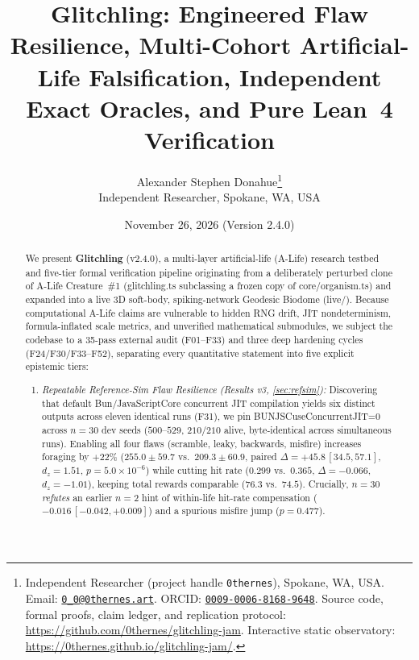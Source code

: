 \documentclass[11pt,a4paper]{article}
\title{\Large\bfseries Glitchling: Engineered Flaw Resilience, Multi-Cohort Artificial-Life Falsification, Independent Exact Oracles, and Pure Lean~4 Verification}
\author{
  Alexander Stephen Donahue\thanks{Independent Researcher (project handle \texttt{0thernes}), Spokane, WA, USA. Email: \href{mailto:0_0@0thernes.art}{\texttt{0\_0@0thernes.art}}. ORCID: \href{https://orcid.org/0009-0006-8168-9648}{\texttt{0009-0006-8168-9648}}. Source code, formal proofs, claim ledger, and replication protocol: \url{https://github.com/0thernes/glitchling-jam}. Interactive static observatory: \url{https://0thernes.github.io/glitchling-jam/}.}\\[0.35em]
  \normalsize Independent Researcher, Spokane, WA, USA
}
\date{November 26, 2026 (Version 2.4.0)}
\numberwithin{equation}{section}
\theoremstyle{plain}
\theoremstyle{definition}
\theoremstyle{remark}
\newcommand{\code}[1]{{\ttfamily\footnotesize\def\_{\textunderscore\penalty0\hskip0pt}#1}}
\begin{document}
\maketitle

\begin{abstract}
We present \textbf{Glitchling} (\code{v2.4.0}), a multi-layer artificial-life (A-Life) research testbed and five-tier formal verification pipeline originating from a deliberately perturbed clone of A-Life Creature~\#1 (\code{glitchling.ts} subclassing a frozen copy of \code{core/\allowbreak organism.ts}) and expanded into a live 3D soft-body, spiking-network Geodesic Biodome (\code{live/}). Because computational A-Life claims are vulnerable to hidden RNG drift, JIT nondeterminism, formula-inflated scale metrics, and unverified mathematical submodules, we subject the codebase to a 35-pass external audit (\code{F01--F33}) and three deep hardening cycles (\code{F24/F30/F33--F52}), separating every quantitative statement into five explicit epistemic tiers:
\begin{enumerate}[leftmargin=1.8em,itemsep=2pt]
  \item \emph{Repeatable Reference-Sim Flaw Resilience (\code{Results v3}, \cref{sec:refsim}):} Discovering that default Bun/JavaScriptCore concurrent JIT compilation yields six distinct outputs across eleven identical runs (\code{F31}), we pin \code{BUN\_JSC\_\allowbreak useConcurrentJIT=0} across $n=30$ dev seeds ($500$--$529$, $210/210$ alive, byte-identical across simultaneous runs). Enabling all four flaws (\code{scramble}, \code{leaky}, \code{backwards}, \code{misfire}) increases foraging by $+22\%$ ($255.0 \pm 59.7$ vs.\ $209.3 \pm 60.9$, paired $\Delta = +45.8\,[34.5, 57.1]$, $d_z = 1.51$, $p = 5.0\times 10^{-6}$) while cutting hit rate ($0.299$ vs.\ $0.365$, $\Delta = -0.066$, $d_z = -1.01$), keeping total rewards comparable ($76.3$ vs.\ $74.5$). Crucially, $n=30$ \emph{refutes} an earlier $n=2$ hint of within-life hit-rate compensation ($-0.016\,[-0.042, +0.009]$) and a spurious \code{misfire} jump ($p = 0.477$).

\end{enumerate}
\end{abstract}
\end{document}
